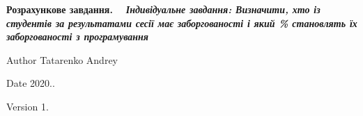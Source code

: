 {\bfseries{ Розрахункове завдання. ~\newline
}} {\bfseries{{\itshape  Індивідуальне завдання\+: Визначити, хто із студентів за результатами сесії має заборгованості і який \% становлять їх заборгованості з програмування }}}~\newline
 \begin{DoxyAuthor}{Author}
Tatarenko Andrey 
\end{DoxyAuthor}
\begin{DoxyDate}{Date}
2020.. 
\end{DoxyDate}
\begin{DoxyVersion}{Version}
1. 
\end{DoxyVersion}
